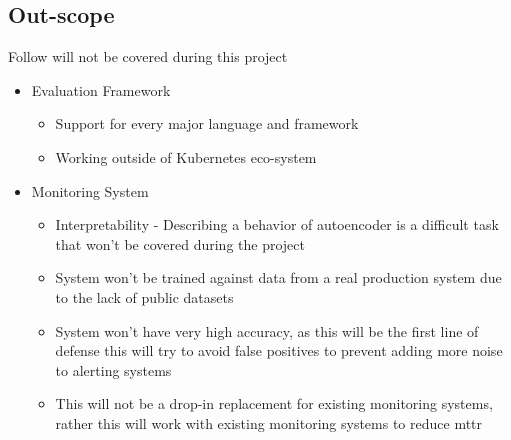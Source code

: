 


\subsection{Out-scope}
Follow will not be covered during this project
\begin{itemize}
    \item Evaluation Framework
    \begin{itemize}
        \item Support for every major language and framework
        \item Working outside of Kubernetes eco-system
    \end{itemize}
    \item Monitoring System
    \begin{itemize}
        \item Interpretability - Describing a behavior of autoencoder is a difficult task that won't be covered during the project
        \item System won't be trained against data from a real production system due to the lack of public datasets
        \item System won't have very high accuracy, as this will be the first line of defense this will try to avoid false positives to prevent adding more noise to alerting systems  
        \item This will not be a drop-in replacement for existing monitoring systems, rather this will work with existing monitoring systems to reduce \ac{mttr}
    \end{itemize}
\end{itemize}

